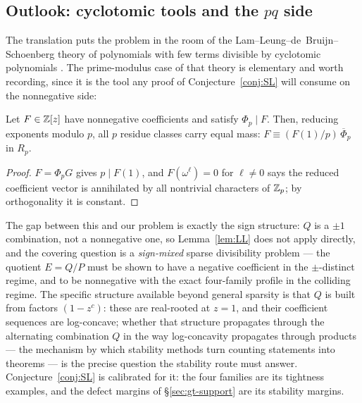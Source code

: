 \subsection{Outlook: cyclotomic tools and the $pq$ side}\label{sec:gt-outlook}

The translation puts the problem in the room of the
Lam--Leung--de~Bruijn--Schoenberg theory of polynomials with few terms
divisible by cyclotomic polynomials
\cite{deBruijnSchoenberg,LamLeung}. The prime-modulus case of that theory is
elementary and worth recording, since it is the tool any proof of
Conjecture~\ref{conj:SL} will consume on the nonnegative side:

\begin{lemma}\label{lem:LL}
Let $F\in\mathbb{Z}[z]$ have nonnegative coefficients and satisfy $\Phi_p\mid F$.
Then, reducing exponents modulo $p$, all $p$ residue classes carry equal
mass: $F\equiv(F(1)/p)\,\overline\Phi_p$ in $R_p$.
\end{lemma}

\begin{proof}
$F=\Phi_pG$ gives $p\mid F(1)$, and $F(\omega^\ell)=0$ for $\ell\ne0$ says
the reduced coefficient vector is annihilated by all nontrivial characters
of $\mathbb{Z}_p$; by orthogonality it is constant.
\end{proof}

The gap between this and our problem is exactly the sign structure: $Q$ is
a $\pm1$ combination, not a nonnegative one, so Lemma~\ref{lem:LL} does not
apply directly, and the covering question is a \emph{sign-mixed} sparse
divisibility problem --- the quotient $E=Q/P$ must be shown to have a
negative coefficient in the $\pm$-distinct regime, and to be nonnegative
with the exact four-family profile in the colliding regime. The specific
structure available beyond general sparsity is that $Q$ is built from
factors $(1-z^{c})$: these are real-rooted at $z=1$, and their coefficient
sequences are log-concave; whether that structure propagates through the
alternating combination $Q$ in the way log-concavity propagates through
products --- the mechanism by which stability methods turn counting
statements into theorems \cite{BrandenHuh} --- is the precise question the
stability route must answer. Conjecture~\ref{conj:SL} is calibrated for it:
the four families are its tightness examples, and the defect margins of
\S\ref{sec:gt-support} are its stability margins.

